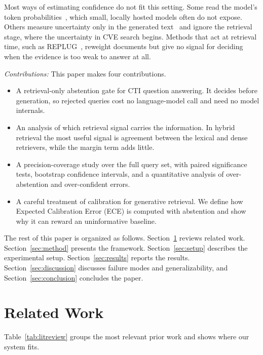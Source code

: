 \documentclass[conference]{IEEEtran}
\begin{document}
Most ways of estimating confidence do not fit this setting. Some read the
model's token probabilities~\cite{ref_varshney}, which small, locally
hosted models often do not expose. Others measure uncertainty only in the
generated text~\cite{ref_kuhn} and ignore the retrieval stage, where the
uncertainty in CVE search begins. Methods that act at retrieval time, such
as REPLUG~\cite{ref_replug}, reweight documents but give no signal for
deciding when the evidence is too weak to answer at all.

\noindent\textit{Contributions:} This paper makes four contributions.
\begin{itemize}[leftmargin=1.4em,topsep=2pt,itemsep=2pt]
\item A retrieval-only abstention gate for CTI question answering. It
decides before generation, so rejected queries cost no language-model
call and need no model internals.
\item An analysis of which retrieval signal carries the information. In
hybrid retrieval the most useful signal is agreement between the lexical
and dense retrievers, while the margin term adds little.
\item A precision-coverage study over the full query set, with paired
significance tests, bootstrap confidence intervals, and a quantitative
analysis of over-abstention and over-confident errors.
\item A careful treatment of calibration for generative retrieval. We
define how Expected Calibration Error (ECE) is computed with abstention and
show why it can reward an uninformative baseline.
\end{itemize}

The rest of this paper is organized as follows.
Section~\ref{sec:related} reviews related work. Section~\ref{sec:method}
presents the framework. Section~\ref{sec:setup} describes the experimental
setup. Section~\ref{sec:results} reports the results.
Section~\ref{sec:discussion} discusses failure modes and generalizability,
and Section~\ref{sec:conclusion} concludes the paper.

\section{Related Work}
\label{sec:related}
Table~\ref{tab:litreview} groups the most relevant prior work and shows
where our system fits.
\end{document}

